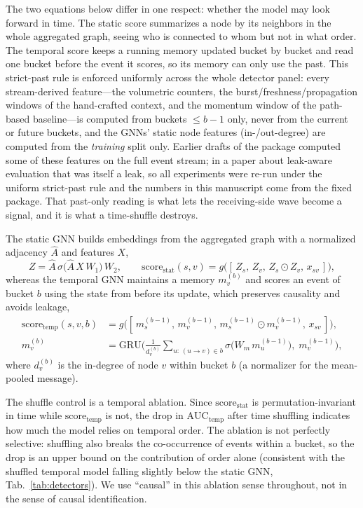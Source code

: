 \smallskip The two equations below differ in one respect: whether the model may
look forward in time. The static score summarizes a node by its neighbors in the whole aggregated graph, seeing
who is connected to whom but not in what order. The temporal score keeps a running memory updated
bucket by bucket and read one bucket before the event it scores, so its memory can only use the past.
This strict-past rule is enforced uniformly across the whole detector panel: every stream-derived
feature---the volumetric counters, the burst/freshness/propagation windows of the hand-crafted context,
and the momentum window of the path-based baseline---is computed from buckets $\le b-1$ only, never from
the current or future buckets, and the GNNs' static node features (in-/out-degree) are computed from the
\emph{training} split only. Earlier drafts of the package computed some of these features on the full
event stream; in a paper about leak-aware evaluation that was itself a leak, so all experiments were
re-run under the uniform strict-past rule and the numbers in this manuscript come from the fixed package.
That past-only
reading is what lets the receiving-side wave become a signal, and it is what a time-shuffle destroys.

\smallskip The static GNN builds embeddings from the aggregated graph with a normalized
adjacency $\hat{A}$ and features $X$,
\begin{equation}
Z = \hat{A}\,\sigma\!\big(\hat{A}\,X\,W_1\big)\,W_2,
\qquad
\mathrm{score}_{\mathrm{stat}}(s,v) = g\!\big([\,Z_s,\,Z_v,\,Z_s\!\odot\!Z_v,\,x_{sv}\,]\big),
\label{eq:static}
\end{equation}
whereas the temporal GNN maintains a memory $m_v^{(b)}$ and scores an event of bucket $b$ using the state from
before its update, which preserves causality and avoids leakage,
\begin{align}
\mathrm{score}_{\mathrm{temp}}(s,v,b) &= g\!\big([\,m_s^{(b-1)},\,m_v^{(b-1)},\,m_s^{(b-1)}\!\odot\!m_v^{(b-1)},\,x_{sv}\,]\big),
\label{eq:temp-score}\\
m_v^{(b)} &= \mathrm{GRU}\!\Big(\tfrac{1}{d_v^{(b)}}\!\!\sum_{u:\,(u\to v)\in b}\!\!\sigma\!\big(W_m\,m_u^{(b-1)}\big),\; m_v^{(b-1)}\Big),
\label{eq:temp-mem}
\end{align}
where $d_v^{(b)}$ is the in-degree of node $v$ within bucket $b$ (a normalizer for the mean-pooled message).

The shuffle control is a temporal ablation. Since $\mathrm{score}_{\mathrm{stat}}$ is permutation-invariant in
time while $\mathrm{score}_{\mathrm{temp}}$ is not, the drop in $\mathrm{AUC}_{\mathrm{temp}}$ after time
shuffling indicates how much the model relies on temporal order. The ablation is not perfectly selective:
shuffling also breaks the co-occurrence of events within a bucket, so the drop is an upper bound on the
contribution of order alone (consistent with the shuffled temporal model falling slightly below the static
GNN, Tab.~\ref{tab:detectors}). We use ``causal'' in this ablation sense throughout, not in the sense of
causal identification.

